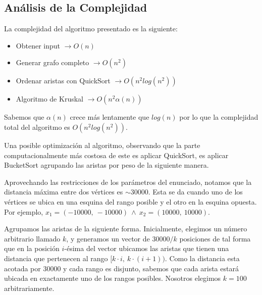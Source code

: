 


\subsection{Análisis de la Complejidad}
\vspace{1em}


La complejidad del algoritmo presentado es la siguiente: 

\begin{itemize}
    \item Obtener input \qquad \qquad \qquad \quad $\rightarrow O(n)$
    \item Generar grafo completo \qquad \quad $\rightarrow O(n^2)$
    \item Ordenar aristas con QuickSort $\rightarrow O(n^2 log(n^2))$
    \item Algoritmo de Kruskal \qquad \qquad $\rightarrow O(n^2 \alpha(n))$
\end{itemize}

Sabemos que $\alpha(n)$ crece más lentamente que $log(n)$ por lo que la complejidad total del algoritmo es $O(n^2 log(n^2))$.

\vspace{1em}

Una posible optimización al algoritmo, observando que la parte computacionalmente más costosa de este es aplicar QuickSort, es aplicar BucketSort agrupando las aristas por peso de la siguiente manera.

\vspace{1em}

Aprovechando las restricciones de los parámetros del enunciado, notamos que la distancia máxima entre dos vértices es $\sim30000$. Esta se da cuando uno de los vértices se ubica en una esquina del rango posible y el otro en la esquina opuesta. Por ejemplo, $x_1 = (-10000, \ -10000) \ \wedge \  x_2 = (10000, \ 10000)$.

\vspace{1em}

Agrupamos las aristas de la siguiente forma. Inicialmente, elegimos un número arbitrario llamado $k$, y generamos un vector de $30000 / k$ posiciones de tal forma que en la posición $i$-ésima del vector ubicamos las aristas que tienen una distancia que pertenecen al rango $[k \cdot i, \ k \cdot (i+1))$. Como la distancia esta acotada por 30000 y cada rango es disjunto, sabemos que cada arista estará ubicada en exactamente uno de los rangos posibles. Nosotros elegimos $k = 100$ arbitrariamente.

